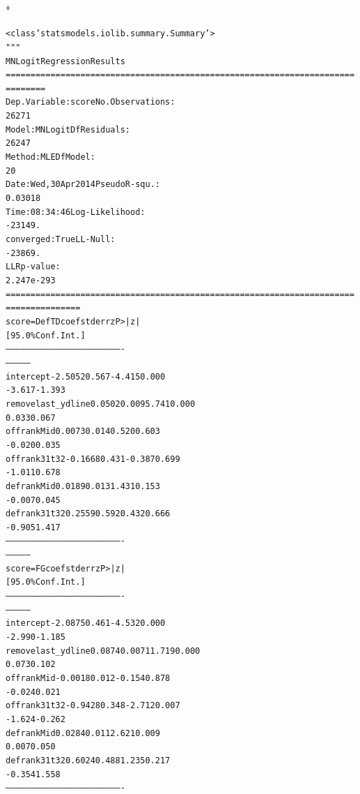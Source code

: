 \documentclass[letterpaper,10pt,english]{/anaconda/lib/python2.7/site-packages/sphinx/texinputs/sphinxhowto}
\def\smaller{\fontsize{9.5pt}{9.5pt}\selectfont}
\newenvironment{InvisibleVerbatim}
        {\begin{mdframed}[leftmargin=0.1\linewidth,innerleftmargin=3pt,innerrightmargin=3pt, userdefinedwidth=1\linewidth, linewidth=0pt, linecolor=white, usetwoside=false]}
        {\end{mdframed}}
\begin{document}
                \makebox[0.1\linewidth]{\smaller\hfill\tt\color{nbframe-out-prompt}Out\hspace{4pt}{[}21{]}:\hspace{4pt}}\\*
                \vspace{-2.55\baselineskip}\begin{InvisibleVerbatim}
                \vspace{-0.5\baselineskip}
\begin{alltt}<class 'statsmodels.iolib.summary.Summary'>
"""
                          MNLogit Regression Results
======================================================================
========
Dep. Variable:                  score   No. Observations:
26271
Model:                        MNLogit   Df Residuals:
26247
Method:                           MLE   Df Model:
20
Date:                Wed, 30 Apr 2014   Pseudo R-squ.:
0.03018
Time:                        08:34:46   Log-Likelihood:
-23149.
converged:                       True   LL-Null:
-23869.
                                        LLR p-value:
2.247e-293
======================================================================
===============
      score=DefTD       coef    std err          z      P>|z|
[95.0\% Conf. Int.]
----------------------------------------------------------------------
---------------
intercept            -2.5052      0.567     -4.415      0.000
-3.617    -1.393
removelast\_ydline     0.0502      0.009      5.741      0.000
0.033     0.067
offrankMid            0.0073      0.014      0.520      0.603
-0.020     0.035
offrank31t32         -0.1668      0.431     -0.387      0.699
-1.011     0.678
defrankMid            0.0189      0.013      1.431      0.153
-0.007     0.045
defrank31t32          0.2559      0.592      0.432      0.666
-0.905     1.417
----------------------------------------------------------------------
---------------
         score=FG       coef    std err          z      P>|z|
[95.0\% Conf. Int.]
----------------------------------------------------------------------
---------------
intercept            -2.0875      0.461     -4.532      0.000
-2.990    -1.185
removelast\_ydline     0.0874      0.007     11.719      0.000
0.073     0.102
offrankMid           -0.0018      0.012     -0.154      0.878
-0.024     0.021
offrank31t32         -0.9428      0.348     -2.712      0.007
-1.624    -0.262
defrankMid            0.0284      0.011      2.621      0.009
0.007     0.050
defrank31t32          0.6024      0.488      1.235      0.217
-0.354     1.558
----------------------------------------------------------------------

\end{alltt}
\end{InvisibleVerbatim}
\end{document}
